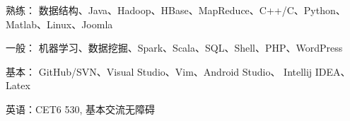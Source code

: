 \vspace{-15pt}


\begin{cventries}
\vspace{-10pt}
  \cventry
    {} %
    {} %
    {} %
    {} %
    {
    	\begin{cvitems} %
	\vspace{-5pt}
	  \item {熟练： 	数据结构、Java、Hadoop、HBase、MapReduce、C++/C、Python、Matlab、Linux、Joomla}
          \item {一般：	机器学习、数据挖掘、Spark、Scala、SQL、Shell、PHP、WordPress}
          \item{基本：	GitHub/SVN、Visual Studio、Vim、Android Studio、 Intellij IDEA、Latex}
          \item {英语：CET6  530, 基本交流无障碍}
        \end{cvitems} 
    }

    

\end{cventries}
